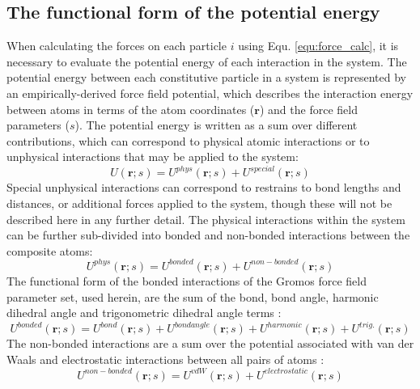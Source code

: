 \subsection{The functional form of the potential energy}
When calculating the forces on each particle $i$ using Equ. \ref{equ:force_calc}, it is necessary to evaluate the potential energy of each interaction in the system. The potential energy between each constitutive particle in a system is represented by an empirically-derived force field potential, which describes the interaction energy between atoms in terms of the atom coordinates ($\mathbf{r}$) and the force field parameters ($s$). The potential energy is written as a sum over different contributions, which can correspond to physical atomic interactions or to unphysical interactions that may be applied to the system:
%
%
\begin{equation}
U(\mathbf{r}; s) = U^{phys}(\mathbf{r}; s) + U^{special}(\mathbf{r}; s)
\end{equation}
%
%
Special unphysical interactions can correspond to restrains to bond lengths and distances, or additional forces applied to the system, though these will not be described here in any further detail. The physical interactions within the system can be further sub-divided into bonded and non-bonded interactions between the composite atoms:
%
%
\begin{equation}
U^{phys}(\mathbf{r}; s) = U^{bonded}(\mathbf{r}; s) + U^{non-bonded}(\mathbf{r}; s)
\end{equation}
%
%
The functional form of the bonded interactions of the Gromos force field parameter set, used herein, are the sum of the bond, bond angle, harmonic dihedral angle and trigonometric dihedral angle terms \cite{Oostenbrink:2004aa}:
%
%
\begin{equation}
U^{bonded}(\mathbf{r}; s) = U^{bond}(\mathbf{r}; s) + U^{bond angle}(\mathbf{r}; s) + U^{harmonic}(\mathbf{r}; s) + U^{trig.}(\mathbf{r}; s)
\end{equation}
%
%
The non-bonded interactions are a sum over the potential associated with van der Waals and electrostatic interactions between all pairs of atoms \cite{Oostenbrink:2004aa}:
%
%
\begin{equation}
U^{non-bonded}(\mathbf{r}; s) = U^{vdW}(\mathbf{r}; s) + U^{electrostatic}(\mathbf{r}; s)
\end{equation}

